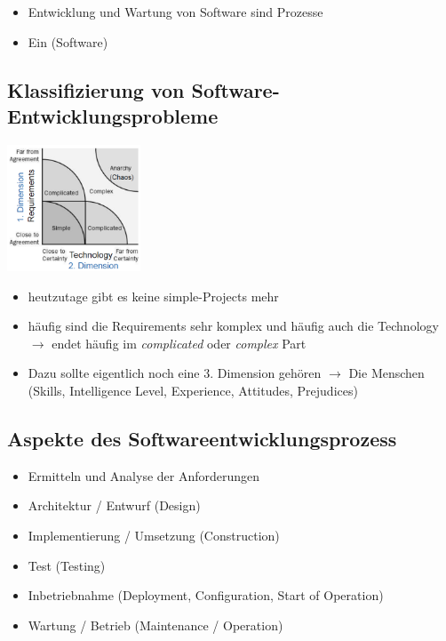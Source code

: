 \documentclass{report}
\newenvironment{Figure}
	{\par\medskip\noindent\minipage{\linewidth}}
	{\endminipage\par\medskip}
\theoremstyle{definition}
\theoremstyle{example}
\begin{document}
\begin{itemize}
   \item Entwicklung und Wartung von Software sind Prozesse
   \item Ein (Software)
\end{itemize}

   \subsection{Klassifizierung von Software-Entwicklungsprobleme}
   \begin{Figure}
      \centering
       \includegraphics[width=150px]{img/AgilePM.png}
           \label{fig:Agile Project Management with Scrum}
   \end{Figure}
   \begin{itemize}
      \item heutzutage gibt es keine simple-Projects mehr
      \item häufig sind die Requirements sehr komplex und häufig auch die Technology $\rightarrow$ endet häufig im \textit{complicated} oder \textit{complex} Part
      \item Dazu sollte eigentlich noch eine 3. Dimension gehören $\rightarrow$ Die Menschen (Skills, Intelligence Level, Experience, Attitudes, Prejudices)
   \end{itemize}

\subsection{Aspekte des Softwareentwicklungsprozess}
\begin{itemize}
   \item Ermitteln und Analyse der Anforderungen
   \item Architektur / Entwurf (Design)
   \item Implementierung / Umsetzung (Construction)
   \item Test (Testing)
   \item Inbetriebnahme (Deployment, Configuration, Start of Operation)
   \item Wartung / Betrieb (Maintenance / Operation)
\end{itemize}
\end{document}
